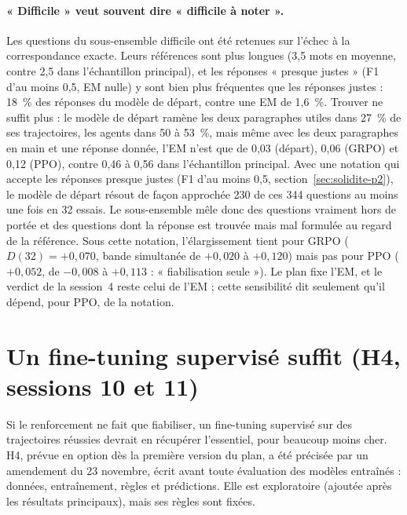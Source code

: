 \documentclass[11pt,a4paper]{article}
\begin{document}
\paragraph{« Difficile » veut souvent dire « difficile à noter ».} Les questions du sous-ensemble difficile ont été retenues sur l'échec à la correspondance exacte. Leurs références sont plus longues (3,5 mots en moyenne, contre 2,5 dans l'échantillon principal), et les réponses « presque justes » (F1 d'au moins 0,5, EM nulle) y sont bien plus fréquentes que les réponses justes : 18~\% des réponses du modèle de départ, contre une EM de 1,6~\%. Trouver ne suffit plus : le modèle de départ ramène les deux paragraphes utiles dans 27~\% de ses trajectoires, les agents dans 50 à 53~\%, mais même avec les deux paragraphes en main et une réponse donnée, l'EM n'est que de 0,03 (départ), 0,06 (GRPO) et 0,12 (PPO), contre 0,46 à 0,56 dans l'échantillon principal. Avec une notation qui accepte les réponses presque justes (F1 d'au moins 0,5, section~\ref{sec:solidite-p2}), le modèle de départ résout de façon approchée 230 de ces 344 questions au moins une fois en 32 essais. Le sous-ensemble mêle donc des questions vraiment hors de portée et des questions dont la réponse est trouvée mais mal formulée au regard de la référence. Sous cette notation, l'élargissement tient pour GRPO ($D(32) = +0{,}070$, bande simultanée de $+0{,}020$ à $+0{,}120$) mais pas pour PPO ($+0{,}052$, de $-0{,}008$ à $+0{,}113$ : « fiabilisation seule »). Le plan fixe l'EM, et le verdict de la session~4 reste celui de l'EM ; cette sensibilité dit seulement qu'il dépend, pour PPO, de la notation.

\section{Un fine-tuning supervisé suffit (H4, sessions 10 et 11)}\label{sec:h4-p2}

Si le renforcement ne fait que fiabiliser, un fine-tuning supervisé sur des trajectoires réussies devrait en récupérer l'essentiel, pour beaucoup moins cher. H4, prévue en option dès la première version du plan, a été précisée par un amendement du 23 novembre, écrit avant toute évaluation des modèles entraînés : données, entraînement, règles et prédictions. Elle est exploratoire (ajoutée après les résultats principaux), mais ses règles sont fixées.
\end{document}
